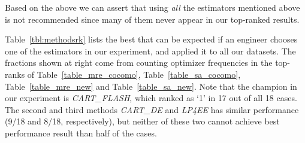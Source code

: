  Based on the above we can assert that
 using  {\em all} the estimators mentioned above is not recommended since many of them never appear in our top-ranked results.










Table~\ref{tbl:methodsrk} lists the best that can be expected if an engineer  chooses one of the
estimators in our experiment, and applied it to all our datasets.
The fractions shown at right come from counting optimizer frequencies in the top-ranks of  Table~\ref{table_mre_cocomo}, Table~\ref{table_sa_cocomo}, Table~\ref{table_mre_new}
and Table~\ref{table_sa_new}. Note that
the champion in our experiment is {\it CART\_FLASH}, which ranked as `1' in 17 out of all 18 cases. The second and third methods {\it CART\_DE} and {\it LP4EE} has similar performance (9/18 and 8/18, respectively), but neither of these two cannot achieve best performance result than half of the cases.


